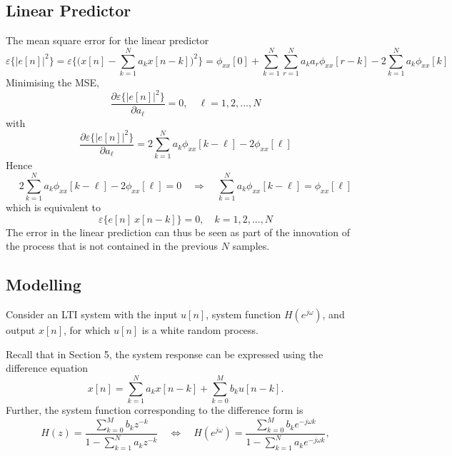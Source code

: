 \subsection{Linear Predictor}
The mean square error for the linear predictor
\[
    \varepsilon\{\lvert e[n] \rvert^2\} = \varepsilon \bigg\{ \bigg( x[n] - \sum_{k=1}^{N} a_k x[n-k] \bigg)^2 \bigg\} = \phi_{xx}[0] + \sum_{k=1}^{N}\sum_{r=1}^N a_k a_r \phi_{xx}[r-k] - 2 \sum_{k=1}^N a_k \phi_{xx}[k]
\]
Minimising the MSE,
\[
    \frac{\partial \varepsilon\{\lvert e[n] \rvert^2\}}{\partial a_{\ell}} = 0, \quad \ell = 1, 2,..., N
\]
with
\[
    \frac{\partial \varepsilon\{\lvert e[n] \rvert^2\}}{\partial a_{\ell}} = 2\sum_{k=1}^N a_k \phi_{xx}[k-\ell] - 2\phi_{xx}[\ell]
\]
Hence
\[
    2\sum_{k=1}^N a_k \phi_{xx}[k-\ell] - 2\phi_{xx}[\ell] = 0 
    \quad \Rightarrow \quad
    \boxed{\sum_{k=1}^N a_k \phi_{xx}[k-\ell] = \phi_{xx}[\ell]}
\]
which is equivalent to
\[
    \varepsilon \{e[n] \ x[n-k] \} = 0, \quad k = 1, 2, ..., N
\]
The error in the linear prediction can thus be seen as part of the innovation of the process that is not contained in the previous $N$ samples.

\subsection{Modelling}
Consider an LTI system with the input $u[n]$, system function $H(e^{j\omega})$, and output $x[n]$, for which $u[n]$ is a white random process.
\begin{figure}[H]
    \centering
\end{figure}
Recall that in Section 5, the system response can be expressed using the difference equation
\[
    x[n] = \sum_{k=1}^{N} a_{k}x[n-k] + \sum_{k=0}^{M} b_{k}u[n-k].
\]
Further, the system function corresponding to the difference form is
\[
    H(z) = \frac{\sum_{k=0}^{M} b_{k} z^{-k}}{1-\sum_{k=1}^{N} a_{k} z^{-k}}
    \quad \Leftrightarrow \quad
    H(e^{j\omega}) = \frac{\sum_{k=0}^M b_k e^{-j\omega k}}{1-\sum_{k=1}^N a_k e^{-j\omega k}},
\]

